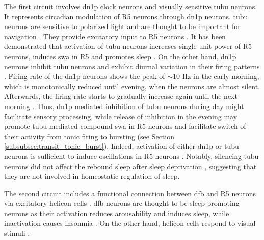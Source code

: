 \documentclass[../main.tex]{subfiles}
\begin{document}
The first circuit involves \gls{dn1p} clock neurons and visually sensitive \gls{tubu} neurons. It represents circadian modulation of R5 neurons through \gls{dn1p} neurons. \gls{tubu} neurons are sensitive to polarized light and are thought to be important for navigation \parencite{suarez-grimaltNeuralArchitectureSleep2021}. They provide excitatory input to R5 neurons \parencite{duanVisualPathwayCentral2023}. It has been demonstrated that activation of \gls{tubu} neurons increases single-unit power of R5 neurons, induces \gls{swa} in R5 and promotes sleep \parencite{andreaniCircadianProgrammingEllipsoid2022,raccugliaNetworkSpecificSynchronizationElectrical2019}. On the other hand, \gls{dn1p} neurons inhibit \gls{tubu} neurons \parencite{lamazeWakePromotingCircadianOutput2018} and exhibit diurnal variation in their firing patterns \parencite{flourakisConservedBicycleModel2015}. Firing rate of the \gls{dn1p} neurons shows the peak of $\sim 10$ Hz in the early morning, which is monotonically reduced until evening, when the neurons are almost silent. Afterwards, the firing rate starts to gradually increase again until the next morning \parencite{flourakisConservedBicycleModel2015}. Thus, \gls{dn1p} mediated inhibition of \gls{tubu} neurons during day might facilitate sensory processing, while release of inhibition in the evening may promote \gls{tubu} mediated compound \gls{swa} in R5 neurons and facilitate switch of their activity from tonic firing to bursting (see Section \ref{subsubsec:transit_tonic_burst}). Indeed, activation of either \gls{dn1p} or \gls{tubu} neurons is sufficient to induce oscillations in R5 neurons \parencite{suarez-grimaltNeuralArchitectureSleep2021,raccugliaNetworkSpecificSynchronizationElectrical2019}. Notably, silencing \gls{tubu} neurons did not affect the rebound sleep after sleep deprivation \parencite{andreaniCircadianProgrammingEllipsoid2022}, suggesting that they are not involved in homeostatic regulation of sleep.

The second circuit includes a functional connection between \gls{dfb} and R5 neurons via excitatory helicon cells \parencite{raccugliaCoherentMultilevelNetwork2022}. \gls{dfb} neurons are thought to be sleep-promoting neurons as their activation reduces arousability and induces sleep, while inactivation causes insomnia \parencite{pimentelOperationHomeostaticSleep2016,suarez-grimaltNeuralArchitectureSleep2021}. On the other hand, helicon cells respond to visual stimuli \parencite{shaferRegulationDrosophilaSleep2021}.
\end{document}
